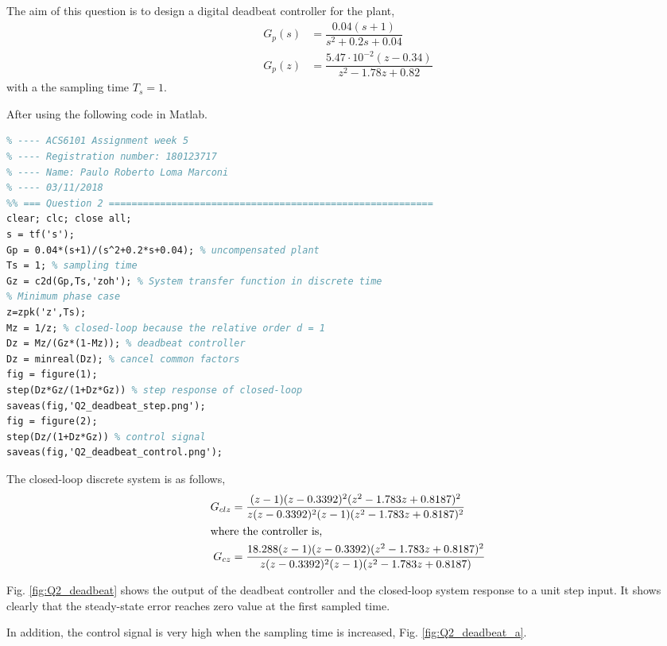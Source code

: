 \documentclass[11pt, a4paper]{article}
\begin{document}
The aim of this question is to design a digital deadbeat controller for the plant,
\begin{align}
G_p(s) &= \dfrac{0.04(s+1)}{s^2+0.2s+0.04} \\
G_p(z) &= \dfrac{5.47\cdot 10^{-2}(z-0.34)}{z^2 - 1.78z + 0.82}
\end{align}
with a the sampling time $T_s=1$.

After using the following code in Matlab.
\begin{lstlisting}[language=tex, caption={}, label={}]
%% ========================================================================
% ---- ACS6101 Assignment week 5
% ---- Registration number: 180123717
% ---- Name: Paulo Roberto Loma Marconi
% ---- 03/11/2018
%% === Question 2 =========================================================
clear; clc; close all;
s = tf('s');
Gp = 0.04*(s+1)/(s^2+0.2*s+0.04); % uncompensated plant
Ts = 1; % sampling time
Gz = c2d(Gp,Ts,'zoh'); % System transfer function in discrete time
% Minimum phase case
z=zpk('z',Ts);
Mz = 1/z; % closed-loop because the relative order d = 1
Dz = Mz/(Gz*(1-Mz)); % deadbeat controller
Dz = minreal(Dz); % cancel common factors
fig = figure(1); 
step(Dz*Gz/(1+Dz*Gz)) % step response of closed-loop
saveas(fig,'Q2_deadbeat_step.png');
fig = figure(2); 
step(Dz/(1+Dz*Gz)) % control signal
saveas(fig,'Q2_deadbeat_control.png');
\end{lstlisting}

The closed-loop discrete system is as follows,
\begin{align}
G_{clz} &= \dfrac{(z-1) (z-0.3392)^2 (z^2 - 1.783z + 0.8187)^2} {z (z-0.3392)^2 (z-1) (z^2 - 1.783z + 0.8187)^2} \\
\intertext{where the controller is,}
G_{cz} &= \dfrac{18.288 (z-1) (z-0.3392) (z^2 - 1.783z + 0.8187)^2}{z (z-0.3392)^2 (z-1) (z^2 - 1.783z + 0.8187)}
\end{align}

Fig. \ref{fig:Q2_deadbeat} shows the output of the deadbeat controller and the closed-loop system response to a unit step input. It shows clearly that the steady-state error reaches zero value at the first sampled time.

In addition, the control signal is very high when the sampling time is increased, Fig. \ref{fig:Q2_deadbeat_a}.
\end{document}
